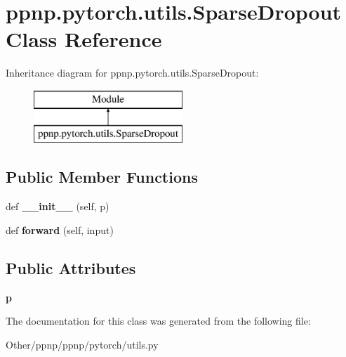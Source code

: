 \hypertarget{classppnp_1_1pytorch_1_1utils_1_1SparseDropout}{}\section{ppnp.\+pytorch.\+utils.\+Sparse\+Dropout Class Reference}
\label{classppnp_1_1pytorch_1_1utils_1_1SparseDropout}
Inheritance diagram for ppnp.\+pytorch.\+utils.\+Sparse\+Dropout\+:\begin{figure}[H]
\begin{center}
\leavevmode
\includegraphics[height=2.000000cm]{classppnp_1_1pytorch_1_1utils_1_1SparseDropout}
\end{center}
\end{figure}
\subsection*{Public Member Functions}
\begin{DoxyCompactItemize}
\item 
\mbox{\label{classppnp_1_1pytorch_1_1utils_1_1SparseDropout_af8a194b40a641a561451fcbc903323bb}} 
def {\bfseries \+\_\+\+\_\+init\+\_\+\+\_\+} (self, p)
\item 
\mbox{\label{classppnp_1_1pytorch_1_1utils_1_1SparseDropout_a53baa5e74706e4331a798c59ef9f5b50}} 
def {\bfseries forward} (self, input)
\end{DoxyCompactItemize}
\subsection*{Public Attributes}
\begin{DoxyCompactItemize}
\item 
\mbox{\label{classppnp_1_1pytorch_1_1utils_1_1SparseDropout_aade33878bb824e2886fb6b89bc0bb924}} 
{\bfseries p}
\end{DoxyCompactItemize}


The documentation for this class was generated from the following file\+:\begin{DoxyCompactItemize}
\item 
Other/ppnp/ppnp/pytorch/utils.\+py\end{DoxyCompactItemize}
